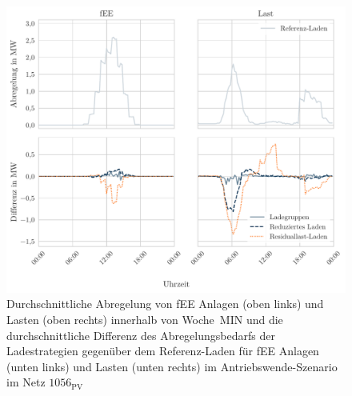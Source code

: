 \begin{figure}[H]
    \centering
    \includegraphics[width=\textwidth]{Bilder/1056_fEE_load_diff}
    \caption[Durchschnittliche Abregelung von fEE Anlagen und Lasten innerhalb von Woche~MIN und die durchschnittliche Differenz des Abregelungsbedarfs der Ladestrategien gegenüber dem Referenz-Laden für fEE Anlagen und Lasten im Antriebswende-Szenario im Netz \num{1056}]{Durchschnittliche Abregelung von fEE Anlagen (oben links) und Lasten (oben rechts) innerhalb von Woche~MIN und die durchschnittliche Differenz des Abregelungsbedarfs der Ladestrategien gegenüber dem Referenz-Laden für fEE Anlagen (unten links) und Lasten (unten rechts) im Antriebswende-Szenario im Netz \(1056_{\text{PV}}\)}\label{fig:1056_fEE_load_diff}
\end{figure}